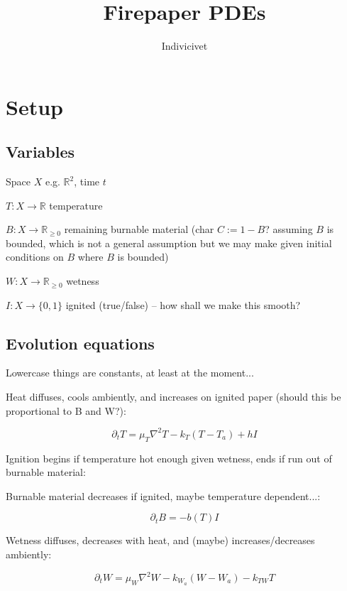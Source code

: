 \documentclass[]{article}
\title{Firepaper PDEs}
\author{Indivicivet}
\begin{document}
\date{}
\maketitle

\section{Setup}

\subsection{Variables}

Space $X$ e.g. $\mathbb{R}^2$, time $t$

$T : X \to \mathbb{R}$ temperature

$B : X \to \mathbb{R}_{\geq 0}$ remaining burnable material (char $C := 1 - B$? assuming $B$ is bounded, which is not a general assumption but we may make given initial conditions on $B$ where $B$ is bounded)

$W : X \to \mathbb{R}_{\geq 0}$ wetness

$I : X \to \{0, 1\}$ ignited (true/false) -- how shall we make this smooth?

\subsection{Evolution equations}

Lowercase things are constants, at least at the moment...

Heat diffuses, cools ambiently, and increases on ignited paper (should this be proportional to B and W?):

$$\partial_{t} T = \mu_{T} \nabla^2 T - k_{T} (T - T_{a}) + h I$$

Ignition begins if temperature hot enough given wetness, ends if run out of burnable material:


Burnable material decreases if ignited, maybe temperature dependent...:


$$\partial_{t} B = -b(T) I$$

Wetness diffuses, decreases with heat, and (maybe) increases/decreases ambiently:

$$\partial_{t} W = \mu_{W} \nabla^2 W - k_{W_{a}} (W - W_{a}) - k_{TW} T$$
\end{document}
